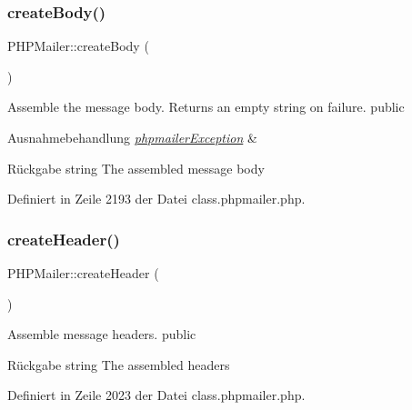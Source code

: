 \mbox{\label{class_p_h_p_mailer_a79754501ca7538d9f9e60706eda37552}} 
\subsubsection{\texorpdfstring{create\+Body()}{createBody()}}
{\footnotesize\ttfamily P\+H\+P\+Mailer\+::create\+Body (\begin{DoxyParamCaption}{ }\end{DoxyParamCaption})}

Assemble the message body. Returns an empty string on failure.  public 
\begin{DoxyExceptions}{Ausnahmebehandlung}
{\em \mbox{\hyperlink{classphpmailer_exception}{phpmailer\+Exception}}} & \\
\hline
\end{DoxyExceptions}
\begin{DoxyReturn}{Rückgabe}
string The assembled message body 
\end{DoxyReturn}


Definiert in Zeile 2193 der Datei class.\+phpmailer.\+php.

\mbox{\label{class_p_h_p_mailer_add8dca06fe959bc4a081db2917ea99ba}} 
\subsubsection{\texorpdfstring{create\+Header()}{createHeader()}}
{\footnotesize\ttfamily P\+H\+P\+Mailer\+::create\+Header (\begin{DoxyParamCaption}{ }\end{DoxyParamCaption})}

Assemble message headers.  public \begin{DoxyReturn}{Rückgabe}
string The assembled headers 
\end{DoxyReturn}


Definiert in Zeile 2023 der Datei class.\+phpmailer.\+php.

\mbox{\label{class_p_h_p_mailer_a5d557c422dd418a81147aeadf65a21d2}} 
